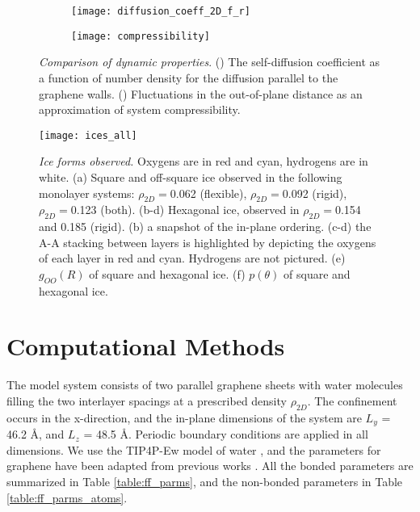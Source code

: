 \documentclass[journal=acsnano,manuscript=article]{achemso}
\begin{document}
\begin{figure}[ht!]
	\centering
	\begin{subfigure}[b]{0.30\textwidth}
    		\texttt{[image: diffusion\_coeff\_2D\_f\_r]}
		\caption{}
    		\label{fig:diff}
   	\end{subfigure}	
	\begin{subfigure}[b]{0.28\textwidth}
    		\texttt{[image: compressibility]}
		\caption{}
    		\label{fig:comp}
   	\end{subfigure}
	\caption{\textit{Comparison of dynamic properties}. (\protect{}) The self-diffusion coefficient as a function of number density for the diffusion parallel to the graphene walls. (\protect{}) Fluctuations in the out-of-plane distance as an approximation of system compressibility.}
	\label{fig:msd}
\end{figure}

\begin{figure}[ht!]
	\centering
	\texttt{[image: ices\_all]}
	\caption{\textit{Ice forms observed.} Oxygens are in red and cyan, hydrogens are in white. (a) Square and off-square ice observed in the following monolayer systems: \(\rho_{2D}=\)0.062 (flexible), \(\rho_{2D}=\)0.092 (rigid), \(\rho_{2D}=\)0.123 (both). (b-d) Hexagonal ice, observed in \(\rho_{2D}=\)0.154 and 0.185 (rigid). (b) a snapshot of the in-plane ordering. (c-d) the A-A stacking between layers is highlighted by depicting the oxygens of each layer in red and cyan. Hydrogens are not pictured. (e) \(g_{OO}(R)\) of square and hexagonal ice. (f) \(p(\theta)\) of square and hexagonal ice.}
	\label{fig:ice_figs}
\end{figure}

\clearpage
\section{Computational Methods}
	
	The model system consists of two parallel graphene sheets with water molecules filling the two interlayer spacings at a prescribed density \(\rho_{2D}\). The confinement occurs in the x-direction, and the in-plane dimensions of the system are \(L_y\) = 46.2 \r A, and  \(L_z\) = 48.5 \r A. Periodic boundary conditions are applied in all dimensions. We use the TIP4P-Ew model of water \cite{Horn2004}, and the parameters for graphene have been adapted from previous works \cite{Hummer2001,Patra2009}. All the bonded parameters are summarized in Table \ref{table:ff_parms}, and the non-bonded parameters in Table \ref{table:ff_parms_atoms}. 
	
\end{document}

